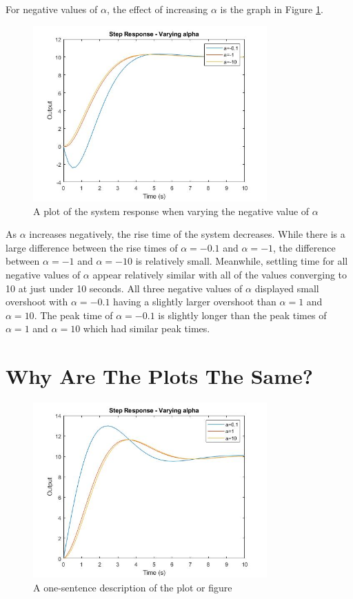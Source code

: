 For negative values of $\alpha$, the effect of increasing $\alpha$ is the graph in Figure \ref{fig:varying-alpha-negative}.
\begin{figure}[H]
	\centering
	\includegraphics[width=0.8\textwidth]{./figures/lab4_fig4-part4-3-2-negative.jpg}
	\caption{A plot of the system response when varying the negative value of $\alpha$}
	\label{fig:varying-alpha-negative}
\end{figure}
As $\alpha$ increases negatively, the rise time of the system decreases. While there is a large difference between the rise times of $\alpha = -0.1$ and $\alpha = -1$, the difference between $\alpha = -1$ and $\alpha = -10$ is relatively small. Meanwhile, settling time for all negative values of $\alpha$ appear relatively similar with all of the values converging to 10 at just under 10 seconds. All three negative values of $\alpha$ displayed small overshoot with $\alpha = -0.1$ having a slightly larger overshoot than $\alpha =1$ and $\alpha = 10$. The peak time of $\alpha = -0.1$ is slightly longer than the peak times of $\alpha = 1$ and $\alpha = 10$ which had similar peak times.

\section{Why Are The Plots The Same?}
\begin{figure}[H]
        \centering
        \includegraphics[width=0.8\textwidth]{./figures/lab4_fig3-part4-3-2-positive.jpg} %
        \caption{A one-sentence description of the plot or figure}
        \label{fig:name} %
\end{figure}

